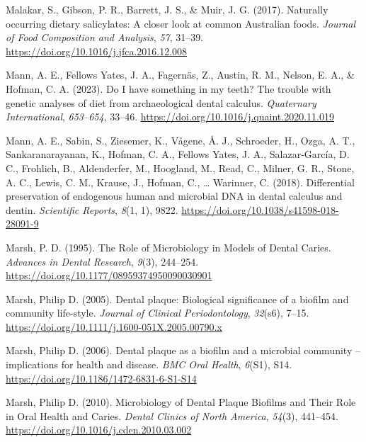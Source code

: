 \documentclass[
  letterpaper,
]{book}
\newlength{\cslhangindent}
\newlength{\cslentryspacingunit} %
\newenvironment{CSLReferences}[2] %
 {%
  \setlength{\parindent}{0pt}
  \ifodd #1
  \let\oldpar\par
  \def\par{\hangindent=\cslhangindent\oldpar}
  \fi
  \setlength{\parskip}{#2\cslentryspacingunit}
 }%
 {}
\begin{document}
\begin{CSLReferences}{1}{0}
\leavevmode{}%
Malakar, S., Gibson, P. R., Barrett, J. S., \& Muir, J. G. (2017).
Naturally occurring dietary salicylates: {A} closer look at common
{Australian} foods. \emph{Journal of Food Composition and Analysis},
\emph{57}, 31--39. \url{https://doi.org/10.1016/j.jfca.2016.12.008}

\leavevmode{}%
Mann, A. E., Fellows Yates, J. A., Fagernäs, Z., Austin, R. M., Nelson,
E. A., \& Hofman, C. A. (2023). Do {I} have something in my teeth? {The}
trouble with genetic analyses of diet from archaeological dental
calculus. \emph{Quaternary International}, \emph{653--654}, 33--46.
\url{https://doi.org/10.1016/j.quaint.2020.11.019}

\leavevmode{}%
Mann, A. E., Sabin, S., Ziesemer, K., Vågene, Å. J., Schroeder, H.,
Ozga, A. T., Sankaranarayanan, K., Hofman, C. A., Fellows Yates, J. A.,
Salazar-García, D. C., Frohlich, B., Aldenderfer, M., Hoogland, M.,
Read, C., Milner, G. R., Stone, A. C., Lewis, C. M., Krause, J., Hofman,
C., \ldots{} Warinner, C. (2018). Differential preservation of
endogenous human and microbial {DNA} in dental calculus and dentin.
\emph{Scientific Reports}, \emph{8}(1, 1), 9822.
\url{https://doi.org/10.1038/s41598-018-28091-9}

\leavevmode{}%
Marsh, P. D. (1995). The {Role} of {Microbiology} in {Models} of {Dental
Caries}. \emph{Advances in Dental Research}, \emph{9}(3), 244--254.
\url{https://doi.org/10.1177/08959374950090030901}

\leavevmode{}%
Marsh, Philip D. (2005). Dental plaque: Biological significance of a
biofilm and community life-style. \emph{Journal of Clinical
Periodontology}, \emph{32}(s6), 7--15.
\url{https://doi.org/10.1111/j.1600-051X.2005.00790.x}

\leavevmode{}%
Marsh, Philip D. (2006). Dental plaque as a biofilm and a microbial
community -- implications for health and disease. \emph{BMC Oral
Health}, \emph{6}(S1), S14.
\url{https://doi.org/10.1186/1472-6831-6-S1-S14}

\leavevmode{}%
Marsh, Philip D. (2010). Microbiology of {Dental Plaque Biofilms} and
{Their Role} in {Oral Health} and {Caries}. \emph{Dental Clinics of
North America}, \emph{54}(3), 441--454.
\url{https://doi.org/10.1016/j.cden.2010.03.002}


\end{CSLReferences}
\end{document}
